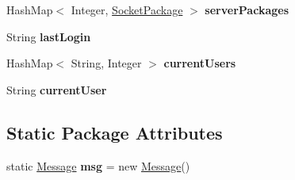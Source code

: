 \begin{DoxyCompactItemize}
\item 
\hypertarget{classhub_1_1_hub_socket_handler_aaa6870d46018c984818192ae159fab19}{
\-Hash\-Map$<$ \-Integer, \hyperlink{classutil_1_1_socket_package}{\-Socket\-Package} $>$ {\bfseries server\-Packages}}
\label{classhub_1_1_hub_socket_handler_aaa6870d46018c984818192ae159fab19}

\item 
\hypertarget{classhub_1_1_hub_socket_handler_a0254174c563ef1198570eb3aba26f7e9}{
\-String {\bfseries last\-Login}}
\label{classhub_1_1_hub_socket_handler_a0254174c563ef1198570eb3aba26f7e9}

\item 
\hypertarget{classhub_1_1_hub_socket_handler_a51c25ddd5351200a1438771513920224}{
\-Hash\-Map$<$ \-String, \-Integer $>$ {\bfseries current\-Users}}
\label{classhub_1_1_hub_socket_handler_a51c25ddd5351200a1438771513920224}

\item 
\hypertarget{classhub_1_1_hub_socket_handler_a80d9a74f6b35505ec17944342a05d8d9}{
\-String {\bfseries current\-User}}
\label{classhub_1_1_hub_socket_handler_a80d9a74f6b35505ec17944342a05d8d9}

\end{DoxyCompactItemize}
\subsection*{\-Static \-Package \-Attributes}
\begin{DoxyCompactItemize}
\item 
\hypertarget{classhub_1_1_hub_socket_handler_a61ad9e50d3019e2fc64303e6e1285b38}{
static \hyperlink{classstorage_1_1_message}{\-Message} {\bfseries msg} = new \hyperlink{classstorage_1_1_message}{\-Message}()}
\label{classhub_1_1_hub_socket_handler_a61ad9e50d3019e2fc64303e6e1285b38}

\end{DoxyCompactItemize}


